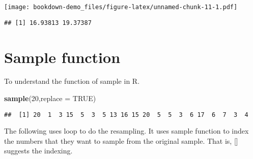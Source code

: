 \documentclass[]{book}
\newenvironment{Shaded}{\begin{snugshade}}{\end{snugshade}}
\newcommand{\ControlFlowTok}[1]{\textcolor[rgb]{0.13,0.29,0.53}{\textbf{#1}}}
\newcommand{\DataTypeTok}[1]{\textcolor[rgb]{0.13,0.29,0.53}{#1}}
\newcommand{\DecValTok}[1]{\textcolor[rgb]{0.00,0.00,0.81}{#1}}
\newcommand{\KeywordTok}[1]{\textcolor[rgb]{0.13,0.29,0.53}{\textbf{#1}}}
\newcommand{\NormalTok}[1]{#1}
\newcommand{\OperatorTok}[1]{\textcolor[rgb]{0.81,0.36,0.00}{\textbf{#1}}}
\newcommand{\OtherTok}[1]{\textcolor[rgb]{0.56,0.35,0.01}{#1}}
\newcommand{\StringTok}[1]{\textcolor[rgb]{0.31,0.60,0.02}{#1}}
\begin{document}
\texttt{[image: bookdown-demo\_files/figure-latex/unnamed-chunk-11-1.pdf]}

\begin{verbatim}
## [1] 16.93813 19.37387
\end{verbatim}

\hypertarget{sample-function}{%
\section{Sample function}\label{sample-function}}

To understand the function of sample in R.

\begin{Shaded}
\begin{Highlighting}[]
\KeywordTok{sample}\NormalTok{(}\DecValTok{20}\NormalTok{,}\DataTypeTok{replace =} \OtherTok{TRUE}\NormalTok{)}
\end{Highlighting}
\end{Shaded}

\begin{verbatim}
##  [1] 20  1  3 15  5  3  5 13 16 15 20  5  5  3  6 17  6  7  3  4
\end{verbatim}

The following uses loop to do the resampling. It uses sample function to index the numbers that they want to sample from the original sample. That is, {[}{]} suggests the indexing.

\begin{Shaded}
\end{Shaded}
\end{document}

